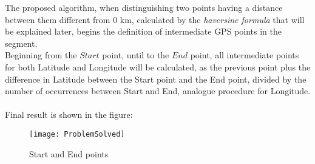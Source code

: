 \documentclass{standalone}
\begin{document}
The proposed algorithm, when distinguishing two points having a distance between them different from $0$ $\si{\km}$, calculated by the \textit{haversine formula} that will be explained later, begins the definition of intermediate GPS points in the segment.\\
Beginning from the $Start$ point, until to the $End$ point, all intermediate points for both Latitude and Longitude will be calculated, as the previous point plus the difference in Latitude between the Start point and the End point, divided by the number of occurrences between Start and End, analogue procedure for Longitude.\\\\
Final result is shown in the figure:

\vspace{0.15cm}
\begin{figure}[H]	
\centering
\texttt{[image: ProblemSolved]} \label{Solved GPS Points Problem}
 \caption{Start and End points}
  \label{fig:Solved GPS Points Problem}
\end{figure}
\end{document}
